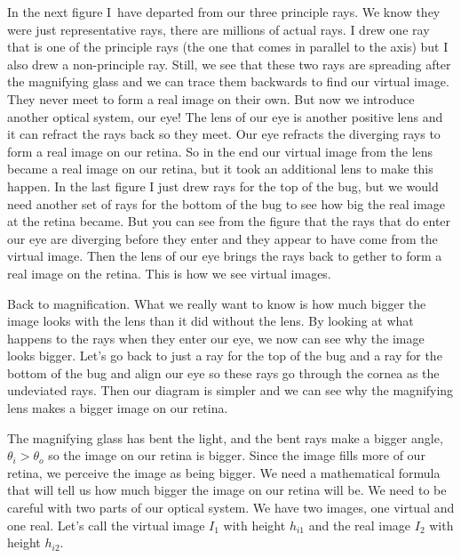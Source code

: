\documentclass{article}
\begin{document}
In the next figure I\ have departed from our three principle rays. We know
they were just representative rays, there are millions of actual rays. I
drew one ray that is one of the principle rays (the one that comes in
parallel to the axis) but I also drew a non-principle ray. Still, we see
that these two rays are spreading after the magnifying glass and we can
trace them backwards to find our virtual image. They never meet to form a
real image on their own. But now we introduce another optical system, our
eye! The lens of our eye is another
positive lens and it can refract the rays back so they meet. Our eye
refracts the diverging rays to form a real image on our retina. So in the
end our virtual image from the lens became a real image on our retina, but
it took an additional lens to make this happen. In the last figure I just
drew rays for the top of the bug, but we would need another set of rays for
the bottom of the bug to see how big the real image at the retina became.
But you can see from the figure that the rays that do enter our eye are
diverging before they enter and they appear to have come from the virtual
image. Then the lens of our eye brings the rays back to gether to form a
real image on the retina. This is how we see virtual images.

Back to magnification. What we really want to know is how much bigger the
image looks with the lens than it did without the lens. By looking at what
happens to the rays when they enter our eye, we now can see why the image
looks bigger. Let's go back to just a ray for the top of the bug and a ray
for the bottom of the bug and align our eye so these rays go through the
cornea as the undeviated rays. Then our diagram is simpler and we can see
why the magnifying lens makes a bigger image on our retina. 

The magnifying glass has bent the light, and the bent rays make a bigger
angle, $\theta _{i}>\theta _{o}$ so the image on our retina is bigger. Since
the image fills more of our retina, we perceive the image as being bigger.
We need a mathematical formula that will tell us how much bigger the image
on our retina will be. We need to be careful with two parts of our optical
system. We have two images, one virtual and one real. Let's call the virtual
image $I_{1}$ with height $h_{i1}$ and the real image $I_{2}$ with height $%
h_{i2}.$
\end{document}
